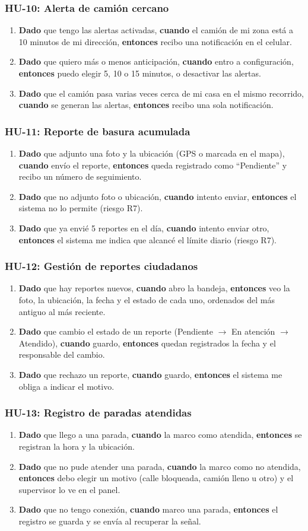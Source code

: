 \documentclass[11pt,a4paper]{article}
\newcommand{\dce}[3]{\textbf{Dado} #1, \textbf{cuando} #2, \textbf{entonces} #3}
\newcommand{\criterios}[1]{\subsubsection*{#1}}
\begin{document}
\criterios{HU-10: Alerta de camión cercano}
\begin{enumerate}
  \item \dce{que tengo las alertas activadas}{el camión de mi zona está a 10 minutos de mi dirección}{recibo una notificación en el celular.}
  \item \dce{que quiero más o menos anticipación}{entro a configuración}{puedo elegir 5, 10 o 15 minutos, o desactivar las alertas.}
  \item \dce{que el camión pasa varias veces cerca de mi casa en el mismo recorrido}{se generan las alertas}{recibo una sola notificación.}
\end{enumerate}

\criterios{HU-11: Reporte de basura acumulada}
\begin{enumerate}
  \item \dce{que adjunto una foto y la ubicación (GPS o marcada en el mapa)}{envío el reporte}{queda registrado como ``Pendiente'' y recibo un número de seguimiento.}
  \item \dce{que no adjunto foto o ubicación}{intento enviar}{el sistema no lo permite (riesgo R7).}
  \item \dce{que ya envié 5 reportes en el día}{intento enviar otro}{el sistema me indica que alcancé el límite diario (riesgo R7).}
\end{enumerate}

\criterios{HU-12: Gestión de reportes ciudadanos}
\begin{enumerate}
  \item \dce{que hay reportes nuevos}{abro la bandeja}{veo la foto, la ubicación, la fecha y el estado de cada uno, ordenados del más antiguo al más reciente.}
  \item \dce{que cambio el estado de un reporte (Pendiente $\rightarrow$ En atención $\rightarrow$ Atendido)}{guardo}{quedan registrados la fecha y el responsable del cambio.}
  \item \dce{que rechazo un reporte}{guardo}{el sistema me obliga a indicar el motivo.}
\end{enumerate}

\criterios{HU-13: Registro de paradas atendidas}
\begin{enumerate}
  \item \dce{que llego a una parada}{la marco como atendida}{se registran la hora y la ubicación.}
  \item \dce{que no pude atender una parada}{la marco como no atendida}{debo elegir un motivo (calle bloqueada, camión lleno u otro) y el supervisor lo ve en el panel.}
  \item \dce{que no tengo conexión}{marco una parada}{el registro se guarda y se envía al recuperar la señal.}
\end{enumerate}
\end{document}
